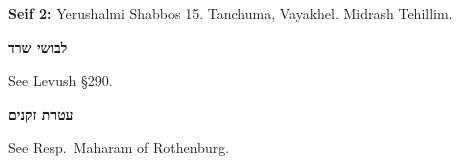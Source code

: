 \documentclass[11pt,letterpaper,openany]{scrbook}
\begin{document}
\begin{sloppypar}
\begin{minipage}[t]{0.12\textwidth}
\begin{sideboxEng}
\textbf{Seif 2:}
Yerushalmi Shabbos 15.
Tanchuma, Vayakhel.
Midrash Tehillim.

\medskip
{\commentaryfont\fontsize{7}{9}\selectfont\textcolor{hcolor}{\textbf{\texthebrew{לבושי שרד}}}}\par\smallskip
See Levush \S290.

\medskip
{\commentaryfont\fontsize{7}{9}\selectfont\textcolor{hcolor}{\textbf{\texthebrew{עטרת זקנים}}}}\par\smallskip
See Resp.~Maharam of Rothenburg.
\end{sideboxEng}
\end{minipage}

\end{sloppypar}
\end{document}
